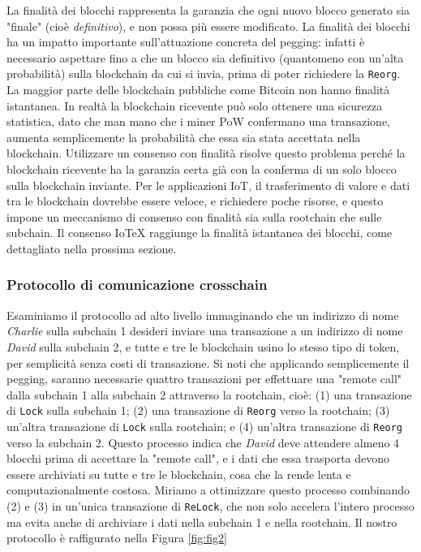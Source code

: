 La finalità dei blocchi rappresenta la garanzia che ogni nuovo blocco generato sia "finale" (cioè \emph{definitivo}), e non possa più essere
modificato. La finalità dei blocchi ha un impatto importante sull'attuazione concreta del pegging:
infatti è necessario aspettare fino a che un blocco sia definitivo (quantomeno con un'alta probabilità) sulla blockchain da cui si invia, prima di poter richiedere la \texttt{Reorg}. La maggior parte delle blockchain pubbliche come Bitcoin non hanno finalità istantanea. In realtà la blockchain ricevente può solo ottenere una sicurezza statistica, dato che man mano che i miner PoW confermano una transazione, aumenta semplicemente la probabilità che essa sia stata accettata nella blockchain. Utilizzare un consenso con finalità risolve questo problema perché la blockchain ricevente ha la garanzia certa già con la conferma di un solo blocco sulla blockchain inviante. Per le applicazioni IoT, il trasferimento di valore e dati tra le blockchain dovrebbe essere veloce, e richiedere poche risorse, e questo impone un meccanismo di consenso con finalità sia sulla rootchain che sulle subchain. Il consenso IoTeX raggiunge la finalità istantanea dei blocchi, come dettagliato nella prossima sezione.

\subsubsection{Protocollo di comunicazione crosschain}
Esaminiamo il protocollo ad alto livello immaginando che un indirizzo di nome \emph{Charlie} sulla
subchain 1 desideri inviare una transazione a un indirizzo di nome \emph{David} sulla subchain 2, e tutte e tre le blockchain usino lo stesso tipo di token, per semplicità senza costi di transazione. Si noti che applicando semplicemente il pegging, saranno necessarie quattro transazioni per effettuare una "remote call" dalla subchain 1 alla subchain 2 attraverso la rootchain, cioè: (1) una transazione di \texttt{Lock} sulla subchain 1; (2) una transazione di \texttt{Reorg} verso la rootchain; (3) un'altra transazione di \texttt{Lock} sulla rootchain; e (4) un'altra transazione di \texttt{Reorg} verso la subchain 2.
Questo processo indica che \emph{David} deve attendere almeno 4 blocchi prima di accettare la "remote call", e i dati che essa trasporta devono essere archiviati su tutte e tre le blockchain, cosa che la rende lenta e computazionalmente costosa. Miriamo a ottimizzare questo processo combinando (2) e (3) in un'unica transazione di \texttt{ReLock}, che non solo accelera l'intero processo ma
evita anche di archiviare i dati nella subchain 1 e nella rootchain. Il nostro protocollo è raffigurato nella Figura \ref{fig:fig2}

